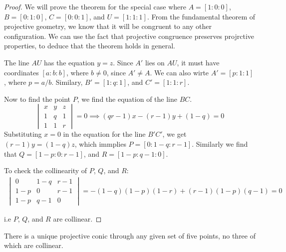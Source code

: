 \begin{proof}
  We will prove the theorem for the special case where $A=[1:0:0]$, $B=[0:1:0]$, $C=[0:0:1]$,
  and $U=[1:1:1]$. From the fundamental theorem of projective geometry, we know that it will be
  congruent to any other configuration. We can use the fact that projective congruence preserves
  projrctive properties, to deduce that the theorem holds in general.

  The line $AU$ has the equation $y=z$. Since $A'$ lies on $AU$, it must have coordinates
  $[a:b:b]$, where $b\ne 0$, since $A'\ne A$. We can also wirte $A'=[p:1:1]$, where $p=a/b$.
  Similary, $B'=[1:q:1]$, and $C'=[1:1:r]$.

  Now to find the point $P$, we find the equation of the line $BC$.
  \[
    \begin{vmatrix}
      x & y & z\\
      1 & q & 1\\
      1 & 1 & r
    \end{vmatrix}
    =0\implies (qr-1)x-(r-1)y+(1-q)=0
  \]
  Substituting $x=0$ in the equation for the line $B'C'$, we get $(r-1)y=(1-q)z$, which immplies
  $P=[0:1-q:r-1]$. Similarly we find that $Q=[1-p:0:r-1]$, and $R=[1-p:q-1:0]$.

  To check the collinearity of $P$, $Q$, and $R$:
  \begin{align*}
    \begin{vmatrix}
      0   & 1-q & r-1 \\
      1-p & 0   & r-1\\
      1-p & q-1 & 0
    \end{vmatrix}
    = -(1-q)(1-p)(1-r)+(r-1)(1-p)(q-1) = 0
  \end{align*}

  i.e $P$, $Q$, and $R$ are collinear.
\end{proof}

\begin{prop}
  There is a unique projective conic through any given set of five points, no three of which are
  collinear.
\end{prop}

